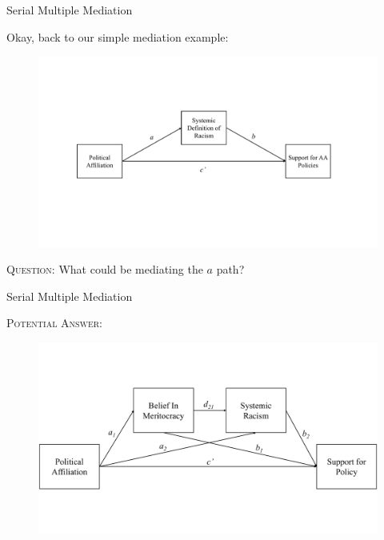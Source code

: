 \documentclass{beamer}
\newcommand{\vx}[1]{\vspace{#1pt}}
\begin{document}
\begin{frame}{Serial Multiple Mediation}
  
  Okay, back to our simple mediation example:
  
  \vx{-12}
  
  \begin{figure}
    \includegraphics[width=\textwidth]{figures/adamsKlpsExample1PathDiagram.pdf}
  \end{figure}

  \vx{-24}
  
  \textsc{Question:} What could be mediating the $a$ path?
  
\end{frame}


\begin{frame}{Serial Multiple Mediation}

  \textsc{Potential Answer:}
  
  \begin{figure}
    \includegraphics[width=\textwidth]{figures/adamsKlpsSerial1.pdf}
  \end{figure}

\end{frame}
\end{document}
